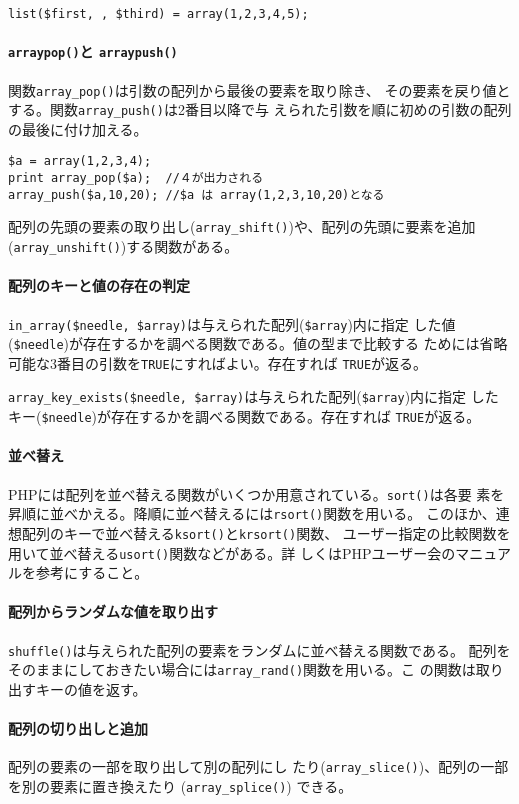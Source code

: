 \begin{Verbatim}
list($first, , $third) = array(1,2,3,4,5);
\end{Verbatim}
\paragraph{\protect\texttt{array\textunderscore pop()}と
\protect\texttt{array\textunderscore push()}}
関数\Verb+array_pop()+は引数の配列から最後の要素を取り除き、
その要素を戻り値とする。関数\Verb+array_push()+は2番目以降で与
えられた引数を順に初めの引数の配列の最後に付け加える。
\begin{Verbatim}
$a = array(1,2,3,4);
print array_pop($a);  //４が出力される
array_push($a,10,20); //$a は array(1,2,3,10,20)となる
\end{Verbatim}
配列の先頭の要素の取り出し(\Verb+array_shift()+)や、配列の先頭に要素を追加
(\Verb+array_unshift()+)する関数がある。
\paragraph{配列のキーと値の存在の判定}
\Verb+in_array($needle, $array)+は与えられた配列(\Verb+$array+)内に指定
した値(\Verb+$needle+)が存在するかを調べる関数である。値の型まで比較する
ためには省略可能な3番目の引数を\Verb+TRUE+にすればよい。存在すれば
\Verb+TRUE+が返る。

\Verb+array_key_exists($needle, $array)+は与えられた配列(\Verb+$array+)内に指定
したキー(\Verb+$needle+)が存在するかを調べる関数である。存在すれば
\Verb+TRUE+が返る。
\paragraph{並べ替え}
PHPには配列を並べ替える関数がいくつか用意されている。\Verb+sort()+は各要
素を昇順に並べかえる。降順に並べ替えるには\Verb+rsort()+関数を用いる。
このほか、連想配列のキーで並べ替える\Verb+ksort()+と\Verb+krsort()+関数、
ユーザー指定の比較関数を用いて並べ替える\Verb+usort()+関数などがある。詳
しくはPHPユーザー会のマニュアルを参考にすること。
\paragraph{配列からランダムな値を取り出す}
\Verb+shuffle()+は与えられた配列の要素をランダムに並べ替える関数である。
配列をそのままにしておきたい場合には\Verb+array_rand()+関数を用いる。こ
の関数は取り出すキーの値を返す。

\paragraph{配列の切り出しと追加}配列の要素の一部を取り出して別の配列にし
たり(\Verb+array_slice()+)、配列の一部を別の要素に置き換えたり
(\Verb+array_splice()+) できる。

